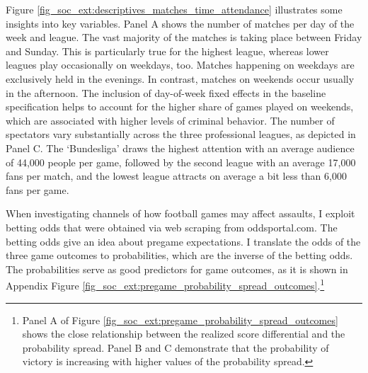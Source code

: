 


Figure \ref{fig_soc_ext:descriptives_matches_time_attendance} illustrates some insights into key variables. Panel A shows the number of matches per day of the week and league. The vast majority of the matches is taking place between Friday and Sunday. This is particularly true for the highest league, whereas lower leagues play occasionally on weekdays, too. Matches happening on weekdays are exclusively held in the evenings. In contrast, matches on weekends occur usually in the afternoon. The inclusion of day-of-week fixed effects in the baseline specification helps to account for the higher share of games played on weekends, which are associated with higher levels of criminal behavior. The number of spectators vary substantially across the three professional leagues, as depicted in Panel C. The `Bundesliga' draws the highest attention with an average audience of 44,000 people per game, followed by the second league with an average 17,000 fans per match, and the lowest league attracts on average a bit less than 6,000 fans per game.

When investigating channels of how football games may affect assaults, I exploit betting odds that were obtained via web scraping from oddsportal.com. The betting odds give an idea about pregame expectations. I translate the odds of the three game outcomes to probabilities, which are the inverse of the betting odds. The probabilities serve as good predictors for game outcomes, as it is shown in Appendix Figure \ref{fig_soc_ext:pregame_probability_spread_outcomes}.\footnote{Panel A of Figure \ref{fig_soc_ext:pregame_probability_spread_outcomes} shows the close relationship between the realized score differential and the probability spread. Panel B and C demonstrate that the probability of victory is increasing with higher values of the probability spread.}


